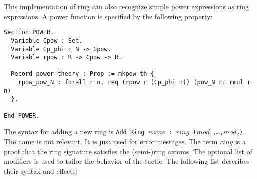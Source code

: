 This implementation of ring can also recognize simple
power expressions as ring expressions. A power function is specified by
the following property:
\begin{verbatim}
Section POWER.
  Variable Cpow : Set.
  Variable Cp_phi : N -> Cpow.
  Variable rpow : R -> Cpow -> R.

  Record power_theory : Prop := mkpow_th {
    rpow_pow_N : forall r n, req (rpow r (Cp_phi n)) (pow_N rI rmul r n)
  }.

End POWER.
\end{verbatim}


The syntax for adding a new ring is {\tt Add Ring $name$ : $ring$
($mod_1$,\dots,$mod_2$)}.  The name is not relevant. It is just used
for error messages. The term $ring$ is a proof that the ring signature
satisfies the (semi-)ring axioms. The optional list of modifiers is
used to tailor the behavior of the tactic. The following list
describes their syntax and effects:
